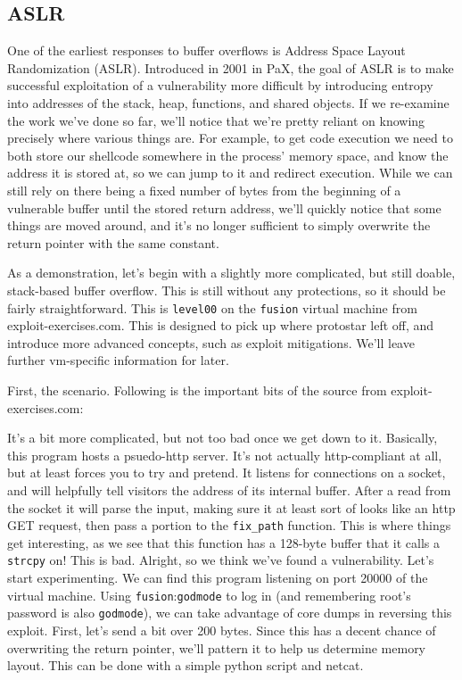 \subsection{ASLR}

One of the earliest responses to buffer overflows is Address Space Layout Randomization (ASLR).
Introduced in 2001 in PaX, the goal of ASLR is to make successful exploitation
of a vulnerability more difficult by introducing entropy into addresses
of the stack, heap, functions, and shared objects. If we re-examine
the work we've done so far, we'll notice that we're pretty reliant
on knowing precisely where various things are. For example, to get code
execution we need to both store our shellcode somewhere in the
process' memory space, and know the address it is stored at, so
we can jump to it and redirect execution. While we can still
rely on there being a fixed number of bytes from the beginning of
a vulnerable buffer until the stored return address, we'll quickly
notice that some things are moved around, and it's no longer
sufficient to simply overwrite the return pointer with the same constant.

As a demonstration, let's begin with a slightly more complicated, but
still doable, stack-based buffer overflow. This is still without
any protections, so it should be fairly straightforward. This is
\texttt{level00} on the \texttt{fusion} virtual machine from exploit-exercises.com.
This is designed to pick up where protostar left off, and introduce
more advanced concepts, such as exploit mitigations. We'll leave
further vm-specific information for later.

First, the scenario. Following is the important bits of the source 
from exploit-exercises.com:



It's a bit more complicated, but not too bad once we get down to it.
Basically, this program hosts a psuedo-http server. It's not
actually http-compliant at all, but at least forces you to try
and pretend. It listens for connections on a socket, and will
helpfully tell visitors the address of its internal buffer.
After a read from the socket it will parse the input, making
sure it at least sort of looks like an http GET request, then
pass a portion to the \texttt{fix\_path} function. This is where 
things get interesting, as we see that this function
has a 128-byte buffer that it calls a \texttt{strcpy} on! This
is bad. Alright, so we think we've found a vulnerability. Let's 
start experimenting. We can find this program listening on
port 20000 of the virtual machine. Using \texttt{fusion}:\texttt{godmode}
to log in (and remembering root's password is also \texttt{godmode}), we
can take advantage of core dumps in reversing this exploit.
First, let's send a bit over 200 bytes. Since this has a decent chance of 
overwriting the return pointer, we'll pattern it to help us 
determine memory layout. This can be done with a simple python script
and netcat.


